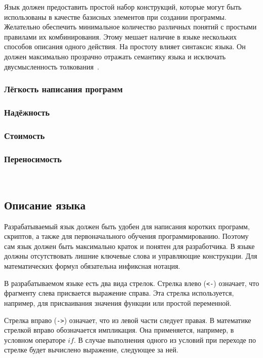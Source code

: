             Язык должен предоставить простой набор конструкций, которые могут быть использованы в качестве базисных элементов при создании программы.
            Желательно обеспечить минимальное количество различных понятий с простыми правилами их комбинирования.
            Этому мешает наличие в языке нескольких способов описания одного действия.
            На простоту влияет синтаксис языка.
            Он должен максимально прозрачно отражать семантику языка и исключать двусмысленность толкования~\cite{langs}.

            
        \subsubsection{Лёгкость написания программ}
        \subsubsection{Надёжность}
        \subsubsection{Стоимость}
        \subsubsection{Переносимость}
        ~\cite{langs}
    \subsection{Описание языка}
        Разрабатываемый язык должен быть удобен для написания коротких программ, скриптов, а также для первоначального обучения программированию.
        Поэтому сам язык должен быть максимально краток и понятен для разработчика.
        В языке должны отсутствовать лишние ключевые слова и управляющие конструкции.
        Для математических формул обязательна инфиксная нотация.

        В разрабатываемом языке есть два вида стрелок.
        Стрелка влево (\verb!<-!) означает, что фрагменту слева присвается выражение справа.
        Эта стрелка используется, например, для присваивания значения функции или простой переменной.

        Стрелка вправо (\verb!->!) означает, что из левой части следует правая.
        В математике стрелкой вправо обозначается импликация.
        Она применяется, например, в условном операторе $if$.
        В случае выполнения одного из условий при переходе по стрелке будет вычислено выражение, следующее за ней.
        
